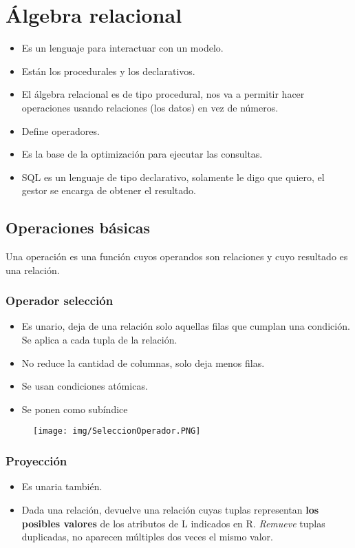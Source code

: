 \section{Álgebra relacional}
\label{sec:relacional}

\begin{itemize}
\item Es un lenguaje para interactuar con un modelo. 
\item Están los procedurales y los declarativos.
\item El álgebra relacional es de tipo procedural, nos va a permitir hacer operaciones usando relaciones (los datos) en vez de números.
\item Define operadores.
\item Es la base de la optimización para ejecutar las consultas.
\item SQL es un lenguaje de tipo declarativo, solamente le digo que quiero, el gestor se encarga de obtener el resultado.
\end{itemize}

\subsection*{Operaciones básicas}
Una operación es una función cuyos operandos son relaciones y cuyo resultado es una relación.

\subsubsection*{Operador selección}
\begin{itemize}
\item Es unario, deja de una relación solo aquellas filas que cumplan una condición. Se aplica a cada tupla de la relación.
\item No reduce la cantidad de columnas, solo deja menos filas.
\item Se usan condiciones atómicas.
\item Se ponen como subíndice
\end{itemize}

\begin{figure}[!htb]
    \centering
    \texttt{[image: img/SeleccionOperador.PNG]}
\end{figure}

\subsubsection*{Proyección}
\begin{itemize}
\item Es unaria también.
\item Dada una relación, devuelve una relación cuyas tuplas representan\textbf{ los posibles valores} de los atributos de L indicados en R. \textit{Remueve} tuplas duplicadas, no aparecen múltiples dos veces el mismo valor.
\end{itemize}


